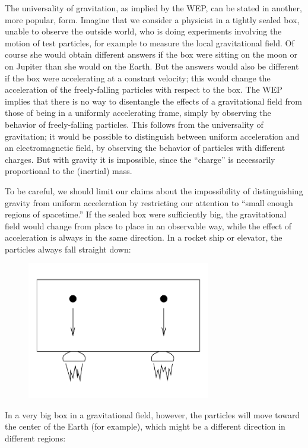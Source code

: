 \documentclass[12pt]{article}
\begin{document}
The universality of gravitation, as implied by the WEP, can be stated
in another, more popular, form.  Imagine that we consider a physicist
in a tightly sealed box, unable to observe the outside world, who is
doing experiments involving the motion of test particles, for example
to measure the local gravitational field.  Of course she would obtain
different answers if the box were sitting on the moon or
on Jupiter than she would on the Earth.  But the answers would also
be different if the box were accelerating at a constant velocity;
this would change the acceleration of the freely-falling particles
with respect to the box.  The WEP implies that there is no way to
disentangle the effects of a gravitational field from those of being
in a uniformly accelerating frame, simply by observing the behavior
of freely-falling particles.  This follows from the universality of
gravitation; it would be possible to distinguish between uniform
acceleration and an electromagnetic field, by observing the behavior
of particles with different charges.  But with gravity it is 
impossible, since the ``charge'' is necessarily proportional to the
(inertial) mass.

To be careful, we should limit our claims about the impossibility of
distinguishing gravity from uniform acceleration by restricting our
attention to ``small enough regions of spacetime.''  If the sealed
box were sufficiently big, the gravitational field would change from
place to place in an observable way, while the effect of acceleration
is always in the same direction.  In a rocket ship or elevator, the
particles always fall straight down:

\begin{figure}[h]
  \centerline{
  \includegraphics[height=6cm]{pdf/four1}}
\end{figure}

\noindent In a very big box in a gravitational field, however, the
particles will move toward the center of the Earth (for example), which
might be a different direction in different regions:
\end{document}

